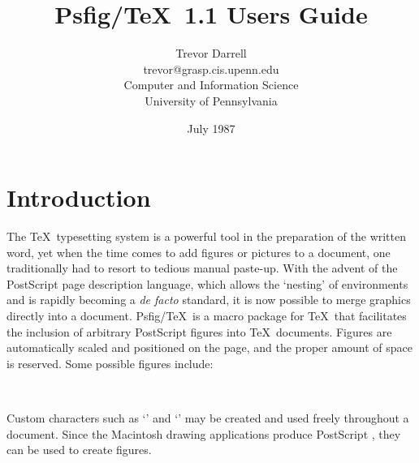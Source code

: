

\def\Ps{{\sc Post\-Script} }
%
\title{Psfig/\TeX\ 1.1 Users Guide}
\author{Trevor Darrell\\
trevor@grasp.cis.upenn.edu\\
Computer and Information Science\\
University of Pennsylvania}
\date{July 1987}
\maketitle
%
\section{Introduction}
The \TeX\ typesetting system is a powerful tool in the preparation of the 
written word, yet when the time comes to add figures or pictures to a document,
one traditionally had to resort to tedious manual paste-up. 
With the advent of the \Ps page description language,
which allows the `nesting' of environments and is rapidly becoming
a {\it de facto} standard, it is now possible to merge graphics
directly into a document. 
Psfig/\TeX\ is a macro package for \TeX\ that facilitates the
inclusion of arbitrary \Ps figures into \TeX\ documents.
Figures are automatically scaled and positioned
on the page, and the proper amount of space is reserved.
Some possible figures include:
\par
\hbox{
\hspace{.3in}
\vbox{\vspace{.5in}}
\vbox{\vspace{.6in}}
}
\par
Custom characters such as
`' and 
`'
may be created and used freely throughout a document. Since the
Macintosh drawing applications produce \Ps, they can be used to create
figures.
%
\par
